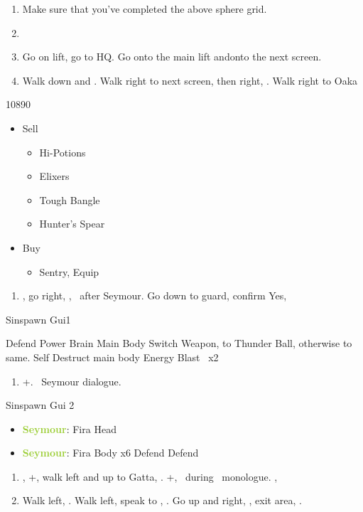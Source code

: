 \begin{enumerate}[resume]
	\item Make sure that you've completed the above sphere grid.
	\item \formation{\tidus}{\yuna}{\wakka}
	\item Go on lift, go to HQ. Go onto the main lift andonto the next screen.
	\item Walk down and \sd. Walk right to next screen, then right, \sd. Walk right to Oaka
\end{enumerate}
\begin{shop}{10890}
	\begin{itemize}
	\item Sell
	\begin{itemize}
		\item Hi-Potions
		\item Elixers
		\item Tough Bangle
		\item Hunter's Spear
	\end{itemize}
	\item Buy
	\begin{itemize}
		\item Sentry, Equip
	\end{itemize}
	\end{itemize}
\end{shop}
\begin{enumerate}[resume]
	\item \sd, go right, \cs[1:00], \sd\ after Seymour. Go down to guard, confirm Yes, \sd
\end{enumerate}
\begin{battle}[12000]{Sinspawn Gui1}
\begin{itemize}
	\tidusf Defend
	\switch{\yuna}{\auron}
	\auronf Power Brain Main Body
	\wakkaf Switch Weapon, to Thunder Ball, otherwise to same.
	\switch{\wakka}{\kimahri}
	\kimahrif Self Destruct main body
	\switch{\tidus}{\yuna}
	\summon{\valefor}
	\valeforf Energy Blast \od\ x2
\end{itemize}
\end{battle}
\begin{enumerate}[resume]
	\item \cs+\skippablefmv[2:20]. \sd\ Seymour dialogue.
\end{enumerate}
\begin{battle}[6000]{Sinspawn Gui 2}
\begin{itemize}
	\item \textbf{\textcolor{YellowGreen}{Seymour}}: Fira Head
	\item \textbf{\textcolor{YellowGreen}{Seymour}}: Fira Body x6
	\yunaf Defend
	\auronf Defend
\end{itemize}
\end{battle}
\begin{enumerate}[resume]
	\item \sd, \cs+\skippablefmv[2:00], walk left and up to Gatta, \sd. \fmv+\cs[1:30], \sd\ during \tidus\ monologue. \cs[1:00], \sd
	\item Walk left, \sd. Walk left, speak to \auron, \sd. Go up and right, \sd, exit area, \sd.
\end{enumerate}

